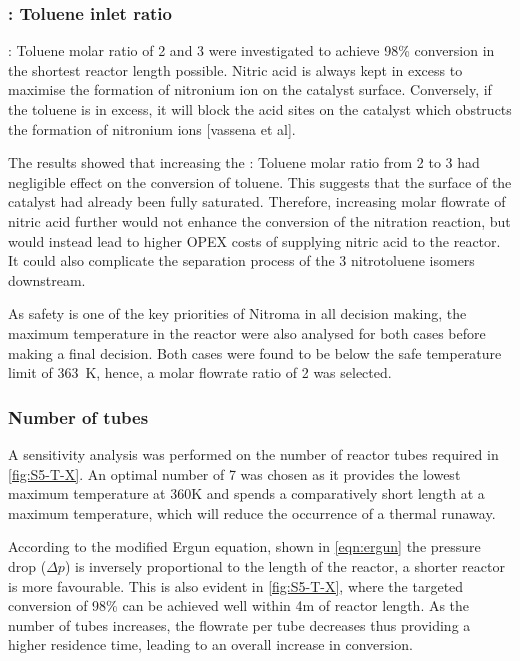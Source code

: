 \subsubsection{ : Toluene inlet ratio}

 : Toluene molar ratio of 2 and 3 were investigated to achieve 98\% conversion in the shortest reactor length possible. Nitric acid is always kept in excess to maximise the formation of nitronium ion on the catalyst surface. Conversely, if the toluene is in excess, it will block the acid sites on the catalyst which obstructs the formation of nitronium ions [vassena et al]. 

The results showed that increasing the  : Toluene molar ratio from 2 to 3 had negligible effect on the conversion of toluene. This suggests that the surface of the catalyst had already been fully saturated. Therefore, increasing molar flowrate of nitric acid further would not enhance the conversion of the nitration reaction, but would instead lead to higher OPEX costs of supplying nitric acid to the reactor. It could also complicate the separation process of the 3 nitrotoluene isomers downstream. 

As safety is one of the key priorities of Nitroma in all decision making, the maximum temperature in the reactor were also analysed for both cases before making a final decision. Both cases were found to be below the safe temperature limit of \SI{363}{\K}, hence, a molar flowrate ratio of 2 was selected.

\subsubsection{Number of tubes}
A sensitivity analysis was performed on the number of reactor tubes required in \cref{fig:S5-T-X}. An optimal number of 7 was chosen as it provides the lowest maximum temperature at 360K and spends a comparatively short length at a maximum temperature, which will reduce the occurrence of a thermal runaway.

According to the modified Ergun equation, shown in \cref{eqn:ergun} the pressure drop ($\Delta p$) is inversely proportional to the length of the reactor, a shorter reactor is more favourable.  This is also evident in \cref{fig:S5-T-X}, where the targeted conversion of 98\% can be achieved well within 4m of reactor length. As the number of tubes increases, the flowrate per tube decreases thus providing a higher residence time, leading to an overall increase in conversion. 

